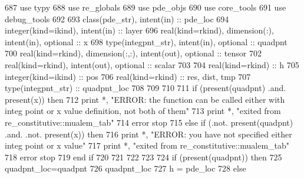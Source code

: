 \begin{DoxyCode}
687       \textcolor{keywordtype}{use }typy
688       \textcolor{keywordtype}{use }re_globals
689       \textcolor{keywordtype}{use }pde_objs
690       \textcolor{keywordtype}{use }core_tools
691       \textcolor{keywordtype}{use }debug_tools
692 
693       \textcolor{keywordtype}{class}(pde_str), \textcolor{keywordtype}{intent(in)} :: pde\_loc
694       \textcolor{keywordtype}{integer(kind=ikind)}, \textcolor{keywordtype}{intent(in)} :: layer
696       \textcolor{keywordtype}{real(kind=rkind)}, \textcolor{keywordtype}{dimension(:)}, \textcolor{keywordtype}{intent(in)}, \textcolor{keywordtype}{optional} :: x
698       \textcolor{keywordtype}{type}(integpnt_str), \textcolor{keywordtype}{intent(in)}, \textcolor{keywordtype}{optional} :: quadpnt      
700       \textcolor{keywordtype}{real(kind=rkind)}, \textcolor{keywordtype}{dimension(:,:)}, \textcolor{keywordtype}{intent(out)}, \textcolor{keywordtype}{optional} :: tensor \textcolor{comment}{        }
702       \textcolor{keywordtype}{real(kind=rkind)}, \textcolor{keywordtype}{intent(out)}, \textcolor{keywordtype}{optional} :: scalar
703 
704       \textcolor{keywordtype}{real(kind=rkind)} :: h
705       \textcolor{keywordtype}{integer(kind=ikind)} :: pos
706       \textcolor{keywordtype}{real(kind=rkind)} :: res, dist, tmp
707       \textcolor{keywordtype}{type}(integpnt_str) :: quadpnt\_loc      
708       
709    
710       
711       \textcolor{keywordflow}{if} (\textcolor{keyword}{present}(quadpnt) .and. \textcolor{keyword}{present}(x)) \textcolor{keywordflow}{then}
712         print *, \textcolor{stringliteral}{"ERROR: the function can be called either with integ point or x value definition, not both
       of them"}
713         print *, \textcolor{stringliteral}{"exited from re\_constitutive::mualem\_tab"}
714         error stop
715       \textcolor{keywordflow}{else} \textcolor{keywordflow}{if} (.not. \textcolor{keyword}{present}(quadpnt) .and. .not. \textcolor{keyword}{present}(x)) \textcolor{keywordflow}{then}
716         print *, \textcolor{stringliteral}{"ERROR: you have not specified either integ point or x value"}
717         print *, \textcolor{stringliteral}{"exited from re\_constitutive::mualem\_tab"}
718         error stop
719 \textcolor{keywordflow}{      end if}
720       
721       
722 
723       
724       \textcolor{keywordflow}{if} (\textcolor{keyword}{present}(quadpnt)) \textcolor{keywordflow}{then}
725         quadpnt\_loc=quadpnt
726         quadpnt\_loc%
727         h = pde\_loc%
728       \textcolor{keywordflow}{else}

\end{DoxyCode}

